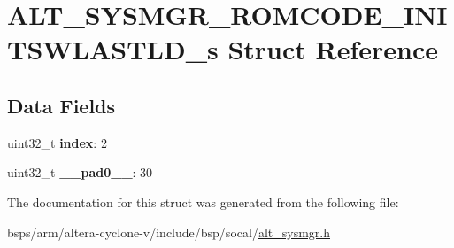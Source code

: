 \hypertarget{structALT__SYSMGR__ROMCODE__INITSWLASTLD__s}{}\section{A\+L\+T\+\_\+\+S\+Y\+S\+M\+G\+R\+\_\+\+R\+O\+M\+C\+O\+D\+E\+\_\+\+I\+N\+I\+T\+S\+W\+L\+A\+S\+T\+L\+D\+\_\+s Struct Reference}
\label{structALT__SYSMGR__ROMCODE__INITSWLASTLD__s}
\subsection*{Data Fields}
\begin{DoxyCompactItemize}
\item 
\mbox{\label{structALT__SYSMGR__ROMCODE__INITSWLASTLD__s_a0f91be1b80adc8c301c5678542c930b7}} 
uint32\+\_\+t {\bfseries index}\+: 2
\item 
\mbox{\label{structALT__SYSMGR__ROMCODE__INITSWLASTLD__s_a03ac87c4aca859883346bdd9ea1f5e07}} 
uint32\+\_\+t {\bfseries \+\_\+\+\_\+pad0\+\_\+\+\_\+}\+: 30
\end{DoxyCompactItemize}


The documentation for this struct was generated from the following file\+:\begin{DoxyCompactItemize}
\item 
bsps/arm/altera-\/cyclone-\/v/include/bsp/socal/\mbox{\hyperlink{alt__sysmgr_8h}{alt\+\_\+sysmgr.\+h}}\end{DoxyCompactItemize}
